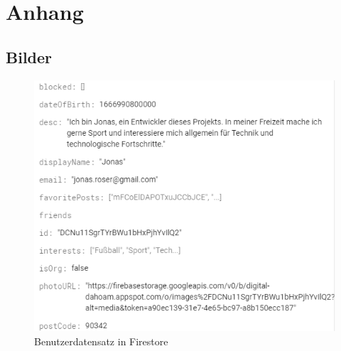 \appendix
{}
\renewcommand{\thechapter}{\Alph{chapter}}
\renewcommand{\thesection}{\Roman{section}}
\renewcommand{\thesubsection}{\Roman{subsection}}
\renewcommand\floatpagefraction{0.1}
\clearpage
\chapter{Anhang}
\label{appendix:annex}

\section{Bilder}
\label{annex:images}

\begin{figure}[ht!]
  \begin{centering}
    \includegraphics[width=1\textwidth]{figures/implementation/firestore-user.png}
    \caption{Benutzerdatensatz in Firestore}
    \label{fig:firestoreUser}
  \end{centering}
\end{figure}

